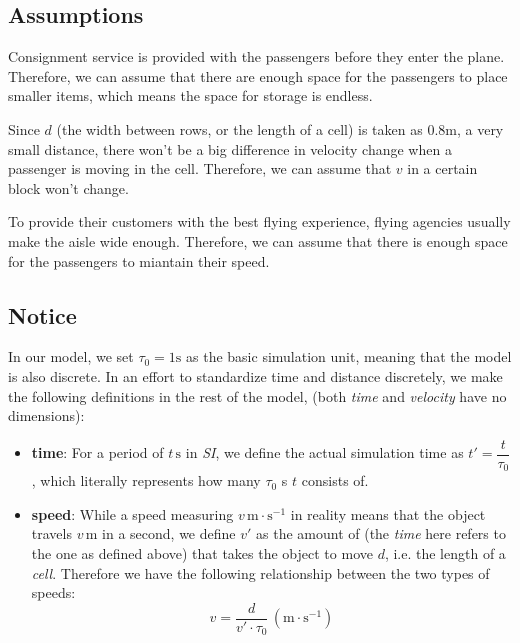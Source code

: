 \documentclass{article}
\theoremstyle{definition}
\theoremstyle{remark}
\numberwithin{equation}{section}
\begin{document}
	\subsection{Assumptions}
	\begin{enumerate}

		Consignment service is provided with the passengers before they enter the plane. Therefore, we can assume that there are enough space for the passengers to place smaller items, which means the space for storage is endless.

		Since $d$ (the width between rows, or the length of a cell) is taken as 0.8$\mathrm{m}$, a very small distance, there won't be a big difference in velocity change when a passenger is moving in the cell. Therefore, we can assume that $v$ in a certain block won't change.
		
		To provide their customers with the best flying experience, flying agencies usually make the aisle wide enough.  Therefore, we can assume that there is enough space for the passengers to miantain their speed.
	\end{enumerate}
	\subsection{Notice}
	In our model, we set \(\tau_0=1\mathrm{s}\) as the basic simulation unit, meaning that the model is also discrete. In an effort to standardize time and distance discretely, we make the following definitions in the rest of the model, (both \textit{time} and \textit{velocity} have no dimensions):
	\begin{itemize}
		\item \textbf{time}:
			For a period of \(t\,\mathrm{s}\) in \textit{SI}, we define the actual simulation time as \(t'=\dfrac{t}{\tau_0}\), which literally represents how many \(\tau_0\) s \(t\) consists of.
		\item \textbf{speed}:
			While a speed measuring \(v\,\mathrm{m\cdot s^{-1}}\) in reality means that the object travels \(v\,\mathrm{m}\) in a second, we define  \(v'\) as the amount of  (the \textit{time} here refers to the one as defined above) that takes the object to move \(d\), i.e. the length of a \textit{cell}. Therefore we have the following relationship between the two types of speeds:\[v=\dfrac{d}{v'\cdot \tau_0}\,\left(\mathrm{m\cdot s^{-1}}\right)\]
	\end{itemize}
\end{document}
